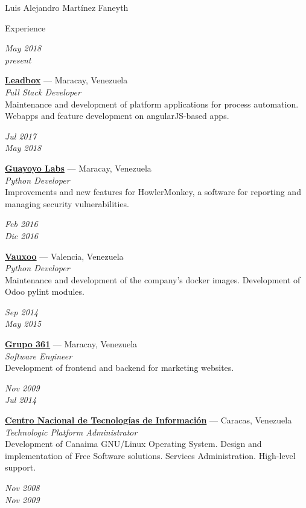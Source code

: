 \documentclass[10pt,letterpaper]{article}
\begin{document}
\begin{cv}{Luis Alejandro Mart\'inez Faneyth}
\begin{cvlist}{Experience}
\item[{\parbox[t]{6em}{\textit{\large{May 2018\\present}}}}]{
	\parbox[t]{\linewidth}{
		\textbf{\href{http://leadboxhq.com}{Leadbox}} --- Maracay, Venezuela\\
		\textit{Full Stack Developer}\\
		\footnotesize{Maintenance and development of platform applications for process automation. Webapps and feature development on angularJS-based apps.}
	}
}
\item[{\parbox[t]{6em}{\textit{\large{Jul 2017\\May 2018}}}}]{
	\parbox[t]{\linewidth}{
		\textbf{\href{https://guayoyolabs.com}{Guayoyo Labs}} --- Maracay, Venezuela\\
		\textit{Python Developer}\\
		\footnotesize{Improvements and new features for HowlerMonkey, a software for reporting and managing security vulnerabilities.}
	}
}
\item[{\parbox[t]{6em}{\textit{\large{Feb 2016\\Dic 2016}}}}]{
	\parbox[t]{\linewidth}{
		\textbf{\href{https://www.vauxoo.com}{Vauxoo}} --- Valencia, Venezuela\\
		\textit{Python Developer}\\
		\footnotesize{Maintenance and development of the company's docker images. Development of Odoo pylint modules.}
	}
}
\item[{\parbox[t]{6em}{\textit{\large{Sep 2014\\May 2015}}}}]{
	\parbox[t]{\linewidth}{
		\textbf{\href{http://www.grupo361.com}{Grupo 361}} --- Maracay, Venezuela\\
		\textit{Software Engineer}\\
		\footnotesize{Development of frontend and backend for marketing websites.}
	}
}
\item[{\parbox[t]{6em}{\textit{\large{Nov 2009\\Jul 2014}}}}]{
	\parbox[t]{\linewidth}{
		\textbf{\href{https://www.cnti.gob.ve}{Centro Nacional de Tecnolog\'ias de Informaci\'on}} --- Caracas, Venezuela\\
		\textit{Technologic Platform Administrator}\\
		\footnotesize{Development of Canaima GNU/Linux Operating System. Design and implementation of Free Software solutions. Services Administration. High-level support.}
	}
}
\item[{\parbox[t]{6em}{\textit{\large{Nov 2008\\Nov 2009}}}}]{
}
\end{cvlist}
\end{cv}
\end{document}
